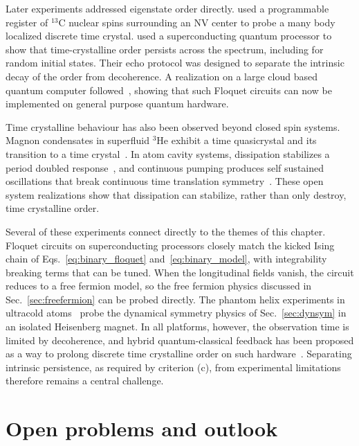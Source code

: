 \documentclass[%
reprint,
superscriptaddress,
amsmath,amssymb,
aps,
prb,
showkeys,%
floatfix,
]{revtex4-2}
\let\cite\citep   %
\begin{document}
	Later experiments addressed eigenstate order directly. \citet{Randall2021} used a programmable register of $^{13}$C nuclear spins surrounding an NV center to probe a many body localized discrete time crystal. \citet{Mi2022} used a superconducting quantum processor to show that time-crystalline order persists across the spectrum, including for random initial states. Their echo protocol was designed to separate the intrinsic decay of the order from decoherence. A realization on a large cloud based quantum computer followed~\cite{FreyRachel2022}, showing that such Floquet circuits can now be implemented on general purpose quantum hardware.
	
	Time crystalline behaviour has also been observed beyond closed spin systems. Magnon condensates in superfluid $^3$He exhibit a time quasicrystal and its transition to a time crystal~\cite{Autti2018}. In atom cavity systems, dissipation stabilizes a period doubled response~\cite{Kessler2021}, and continuous pumping produces self sustained oscillations that break continuous time translation symmetry~\cite{Kongkhambut2022}. These open system realizations show that dissipation can stabilize, rather than only destroy, time crystalline order.
	
	Several of these experiments connect directly to the themes of this chapter. Floquet circuits on superconducting processors closely match the kicked Ising chain of Eqs.~\eqref{eq:binary_floquet} and~\eqref{eq:binary_model}, with integrability breaking terms that can be tuned. When the longitudinal fields vanish, the circuit reduces to a free fermion model, so the free fermion physics discussed in Sec.~\ref{sec:freefermion} can be probed directly. The phantom helix experiments in ultracold atoms~\cite{Jepsen2022} probe the dynamical symmetry physics of Sec.~\ref{sec:dynsym} in an isolated Heisenberg magnet. In all platforms, however, the observation time is limited by decoherence, and hybrid quantum-classical feedback has been proposed as a way to prolong discrete time crystalline order on such hardware~\cite{PhysRevResearch.6.033092}. Separating intrinsic persistence, as required by criterion (c), from experimental limitations therefore remains a central challenge.
	
	\section{\label{sec:outlook}Open problems and outlook}
	
\end{document}
